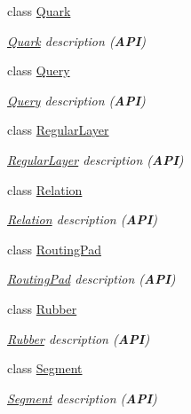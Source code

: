 \begin{DoxyCompactItemize}
class \mbox{\hyperlink{classHurricane_1_1Quark}{Quark}}
\begin{DoxyCompactList}\small\item\em \mbox{\hyperlink{classHurricane_1_1Quark}{Quark}} description ({\bfseries A\+PI}) \end{DoxyCompactList}\item 
class \mbox{\hyperlink{classHurricane_1_1Query}{Query}}
\begin{DoxyCompactList}\small\item\em \mbox{\hyperlink{classHurricane_1_1Query}{Query}} description ({\bfseries A\+PI}) \end{DoxyCompactList}\item 
class \mbox{\hyperlink{classHurricane_1_1RegularLayer}{Regular\+Layer}}
\begin{DoxyCompactList}\small\item\em \mbox{\hyperlink{classHurricane_1_1RegularLayer}{Regular\+Layer}} description ({\bfseries A\+PI}) \end{DoxyCompactList}\item 
class \mbox{\hyperlink{classHurricane_1_1Relation}{Relation}}
\begin{DoxyCompactList}\small\item\em \mbox{\hyperlink{classHurricane_1_1Relation}{Relation}} description ({\bfseries A\+PI}) \end{DoxyCompactList}\item 
class \mbox{\hyperlink{classHurricane_1_1RoutingPad}{Routing\+Pad}}
\begin{DoxyCompactList}\small\item\em \mbox{\hyperlink{classHurricane_1_1RoutingPad}{Routing\+Pad}} description ({\bfseries A\+PI}) \end{DoxyCompactList}\item 
class \mbox{\hyperlink{classHurricane_1_1Rubber}{Rubber}}
\begin{DoxyCompactList}\small\item\em \mbox{\hyperlink{classHurricane_1_1Rubber}{Rubber}} description ({\bfseries A\+PI}) \end{DoxyCompactList}\item 
class \mbox{\hyperlink{classHurricane_1_1Segment}{Segment}}
\begin{DoxyCompactList}\small\item\em \mbox{\hyperlink{classHurricane_1_1Segment}{Segment}} description ({\bfseries A\+PI}) \end{DoxyCompactList}\item 

\end{DoxyCompactItemize}
